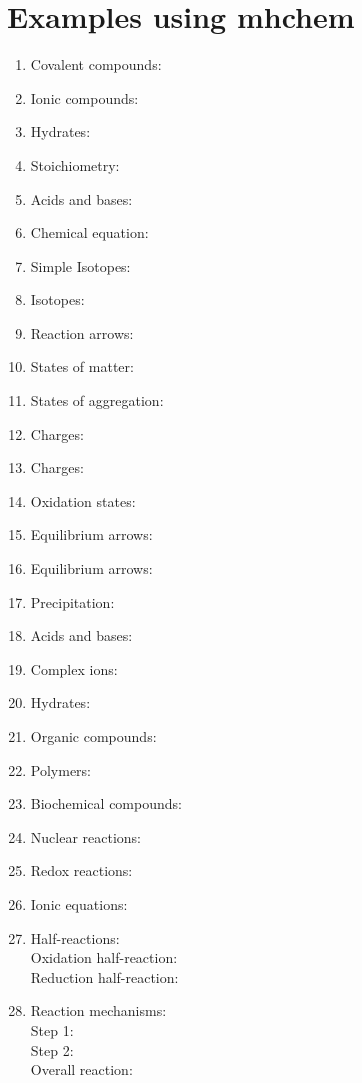 \documentclass[border=5mm]{standalone}
\begin{document}
\begin{minipage}{\textwidth}
\section*{Examples using mhchem}

\begin{enumerate}
\item Covalent compounds: 
\item Ionic compounds: 
\item Hydrates: 
\item Stoichiometry: 
\item Acids and bases: 
\item Chemical equation: 
\item Simple Isotopes: 
\item Isotopes: 
\item Reaction arrows: 
\item States of matter: 
\item States of aggregation: 
\item Charges: 
\item Charges: 
\item Oxidation states: 
\item Equilibrium arrows: 
\item Equilibrium arrows: 
\item Precipitation: 
\item Acids and bases: 
\item Complex ions: 
\item Hydrates: 
\item Organic compounds: 
\item Polymers: 
\item Biochemical compounds: 
\item Nuclear reactions: 
\item Redox reactions: 
\item Ionic equations: 
\item Half-reactions:\\ 
Oxidation half-reaction:  \\
Reduction half-reaction: 
\item Reaction mechanisms:\\
Step 1:  \\
Step 2:  \\
Overall reaction: 
\end {enumerate}
\end {minipage}
\end{document}
